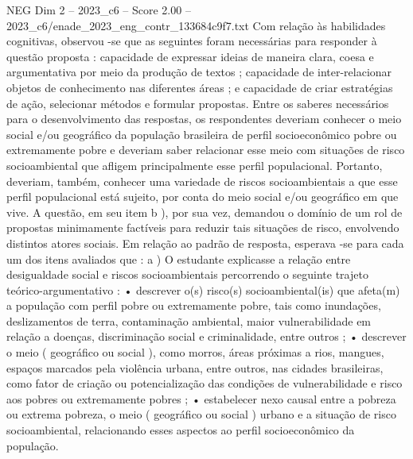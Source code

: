 \begin{textsample}{NEG Dim 2 – 2023\_c6 – Score 2.00 – 2023\_c6/enade\_2023\_eng\_contr\_133684c9f7.txt}
Com relação às habilidades cognitivas, observou -se que as seguintes foram necessárias para responder à questão proposta : capacidade de expressar ideias de maneira clara, coesa e argumentativa por meio da produção de textos ; capacidade de inter-relacionar objetos de conhecimento nas diferentes áreas ; e capacidade de criar estratégias de ação, selecionar métodos e formular propostas.
Entre os saberes necessários para o desenvolvimento das respostas, os respondentes deveriam conhecer o meio social e/ou geográfico da população brasileira de perfil socioeconômico pobre ou extremamente pobre e deveriam saber relacionar esse meio com situações de risco socioambiental que afligem principalmente esse perfil populacional.
Portanto, deveriam, também, conhecer uma variedade de riscos socioambientais a que esse perfil populacional está sujeito, por conta do meio social e/ou geográfico em que vive.
A questão, em seu item b ), por sua vez, demandou o domínio de um rol de propostas minimamente factíveis para reduzir tais situações de risco, envolvendo distintos atores sociais.
Em relação ao padrão de resposta, esperava -se para cada um dos itens avaliados que : a ) O estudante explicasse a relação entre desigualdade social e riscos socioambientais percorrendo o seguinte trajeto teórico-argumentativo : • descrever o(s) risco(s) socioambiental(is) que afeta(m) a população com perfil pobre ou extremamente pobre, tais como inundações, deslizamentos de terra, contaminação ambiental, maior vulnerabilidade em relação a doenças, discriminação social e criminalidade, entre outros ; • descrever o meio ( geográfico ou social ), como morros, áreas próximas a rios, mangues, espaços marcados pela violência urbana, entre outros, nas cidades brasileiras, como fator de criação ou potencialização das condições de vulnerabilidade e risco aos pobres ou extremamente pobres ; • estabelecer nexo causal entre a pobreza ou extrema pobreza, o meio ( geográfico ou social ) urbano e a situação de risco socioambiental, relacionando esses aspectos ao perfil socioeconômico da população.

\end{textsample}
